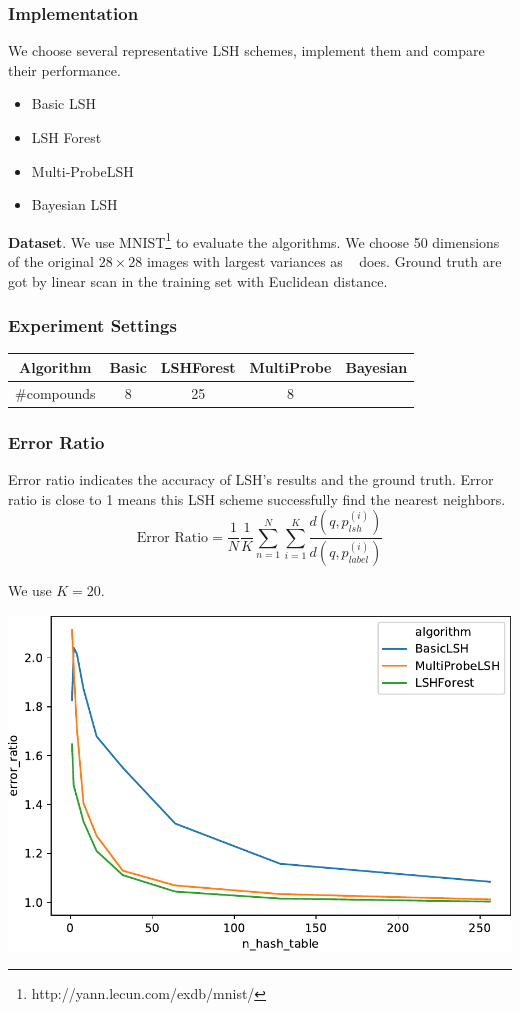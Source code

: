 \begin{frame}
\frametitle{Implementation}
We choose several representative LSH schemes, implement them and compare their performance.
\begin{multicols}{2}
\begin{itemize}
	\item Basic LSH
	\item LSH Forest
	\item Multi-ProbeLSH
	\item Bayesian LSH
\end{itemize}
\end{multicols}

\textbf{Dataset}. We use MNIST\footnote{http://yann.lecun.com/exdb/mnist/} to evaluate the algorithms. We choose 50 dimensions of the original $28\times28$ images with largest variances as ~\cite{gan2012locality} does. Ground truth are got by linear scan in the training set with Euclidean distance.
\end{frame}

\begin{frame}[shrink]
	\frametitle{Experiment Settings}
	\begin{table}
		\begin{tabular}{ccccc}
			\hline
			Algorithm & Basic & LSHForest & MultiProbe & Bayesian \\ \hline
			\#compounds & 8 & 25 & 8 & \\\hline
		\end{tabular}
	\end{table}
\end{frame}

\begin{frame}[allowframebreaks]
\frametitle{Error Ratio}
Error ratio indicates the accuracy of LSH's results and the ground truth.
Error ratio is close to 1 means this LSH scheme successfully find the nearest neighbors.
	\begin{equation}
		\text{Error Ratio}=\frac{1}{N}\frac{1}{K}\sum_{n=1}^{N}\sum_{i=1}^{K}\frac{d(q, p_{lsh}^{(i)})}{d(q, p_{label}^{(i)})}
	\end{equation}
	
We use $K=20$.

	\includegraphics[width=\textwidth]{figures/error_ratio}
\end{frame}

